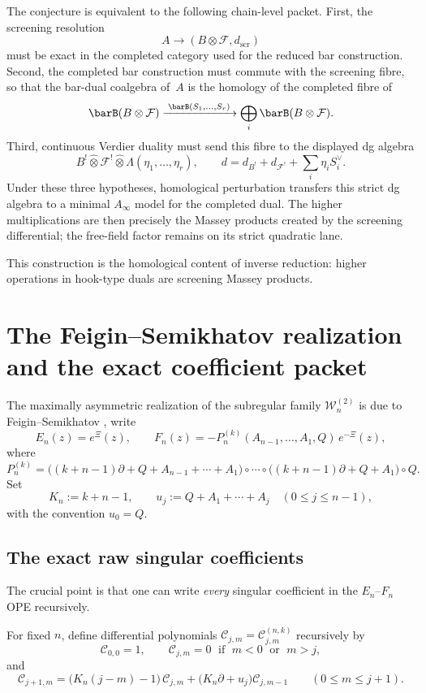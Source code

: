 \begin{remark}
The conjecture is equivalent to the following chain-level packet.
First, the screening resolution
\[
A\longrightarrow (B\otimes\mathcal F,d_{\mathrm{scr}})
\]
must be exact in the completed category used for the reduced bar
construction. Second, the completed bar construction must commute with
the screening fibre, so that the bar-dual coalgebra of~$A$ is the
homology of the completed fibre of
\[
\barB(B\otimes\mathcal F)
\xrightarrow{\;\barB(S_1,\ldots,S_r)\;}
\bigoplus_i\barB(B\otimes\mathcal F).
\]
Third, continuous Verdier duality must send this fibre to the displayed
dg algebra
\[
B^!\widehat\otimes \mathcal F^!
\widehat\otimes \Lambda(\eta_1,\ldots,\eta_r),
\qquad
d=d_{B^!}+d_{\mathcal F^!}+\sum_i\eta_iS_i^\vee.
\]
Under these three hypotheses, homological perturbation transfers this
strict dg algebra to a minimal $A_\infty$ model for the completed
dual. The higher multiplications are then precisely the Massey
products created by the screening differential; the free-field factor remains
on its strict quadratic lane.
\end{remark}

This construction is the homological content of inverse reduction: higher
operations in hook-type duals are screening Massey products.

\section{The Feigin--Semikhatov realization and the exact coefficient packet}

The maximally asymmetric realization of the subregular family
$\mathcal W_n^{(2)}$ is due to Feigin--Semikhatov
\cite{FeiginSemikhatov}, write
\[
E_n(z)=e^{\Xi}(z),
\qquad
F_n(z)=-P_n^{(k)}(A_{n-1},\dots,A_1,Q)\,e^{-\Xi}(z),
\]
where
\[
P_n^{(k)}
=
\bigl((k+n-1)\partial + Q+A_{n-1}+\cdots+A_1\bigr)\circ\cdots\circ
\bigl((k+n-1)\partial + Q+A_1\bigr)\circ Q.
\]
Set
\[
K_n:=k+n-1,
\qquad
u_j:=Q+A_1+\cdots+A_j
\quad (0\leq j\leq n-1),
\]
with the convention $u_0=Q$.

\subsection{The exact raw singular coefficients}

The crucial point is that one can write \emph{every} singular coefficient in
the $E_n$--$F_n$ OPE recursively.

\begin{definition}
\label{def:raw-coefficient-operators}
For fixed $n$, define differential polynomials
$\mathcal C_{j,m}=\mathcal C_{j,m}^{(n,k)}$ recursively by
\[
\mathcal C_{0,0}=1,
\qquad
\mathcal C_{j,m}=0 \;\text{ if }\; m<0 \;\text{ or }\; m>j,
\]
and
\[
\mathcal C_{j+1,m}
=
\bigl(K_n(j-m)-1\bigr)\,\mathcal C_{j,m}
+
\bigl(K_n\partial + u_j\bigr)\mathcal C_{j,m-1}
\qquad
(0\leq m\leq j+1).
\]
\end{definition}

